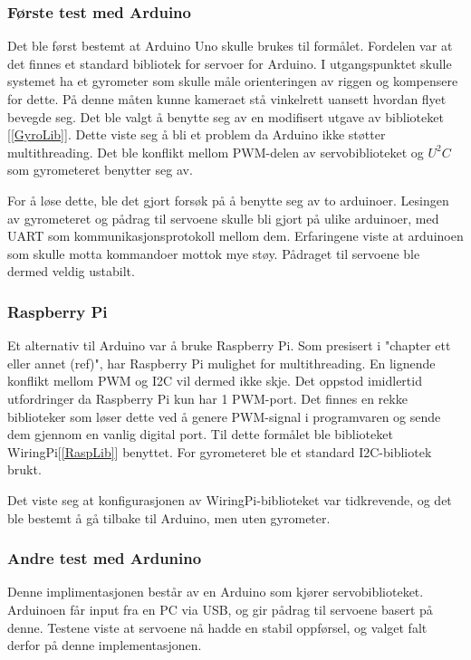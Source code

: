 \subsubsection{Første test med Arduino}
Det ble først bestemt at Arduino Uno skulle brukes til formålet. Fordelen var at det finnes et standard bibliotek for servoer for Arduino. I utgangspunktet skulle systemet ha et gyrometer som skulle måle orienteringen av riggen og kompensere for dette. På denne måten kunne kameraet stå vinkelrett uansett hvordan flyet bevegde seg. Det ble valgt å benytte seg av en modifisert utgave av biblioteket [\ref{GyroLib}]. Dette viste seg å bli et problem da Arduino ikke støtter multithreading. Det ble konflikt mellom PWM-delen av servobiblioteket og $U^2C$ som gyrometeret benytter seg av.

For å løse dette, ble det gjort forsøk på å benytte seg av to arduinoer. Lesingen av gyrometeret og pådrag til servoene skulle bli gjort på ulike arduinoer, med UART som kommunikasjonsprotokoll mellom dem. Erfaringene viste at arduinoen som skulle motta kommandoer mottok mye støy. Pådraget til servoene ble dermed veldig ustabilt.

\subsubsection{Raspberry Pi}
Et alternativ til Arduino var å bruke Raspberry Pi. Som presisert i "chapter ett eller annet (ref)", har Raspberry Pi mulighet for multithreading. En lignende konflikt mellom PWM og I2C vil dermed ikke skje. Det oppstod imidlertid utfordringer da Raspberry Pi kun har 1 PWM-port. Det finnes en rekke biblioteker som løser dette ved å genere PWM-signal i programvaren og sende dem gjennom en vanlig digital port. Til dette formålet ble biblioteket WiringPi[\ref{RaspLib}] benyttet. For gyrometeret ble et standard I2C-bibliotek brukt. 

Det viste seg at konfigurasjonen av WiringPi-biblioteket var tidkrevende, og det ble bestemt å gå tilbake til Arduino, men uten gyrometer.

\subsubsection{Andre test med Ardunino}
Denne implimentasjonen består av en Arduino som kjører servobiblioteket. Arduinoen får input fra en PC via USB, og gir pådrag til servoene basert på denne. Testene viste at servoene nå hadde en stabil oppførsel, og valget falt derfor på denne implementasjonen.

